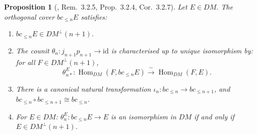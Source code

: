 \documentclass[12pt,a4paper]{article}
\newtheorem{proposition}[theorem]{Proposition}
\theoremstyle{definition}
\newcommand{\Hom}{\operatorname{Hom}}
\newcommand{\id}{\mathrm{id}}
\begin{document}
\begin{proposition}[\cite{Pel17}, Rem.\ 3.2.5, Prop.\ 3.2.4, Cor.\ 3.2.7]
\label{prop:bc-properties}
Let $E\in DM$.  The orthogonal cover $bc_{\leq n}E$ satisfies:
\begin{enumerate}
  \item $bc_{\leq n}E\in DM^\perp(n+1)$.
  \item The counit $\theta_n:j_{n+1}p_{n+1}\to\id$ is characterised up to unique
    isomorphism by: for all $F\in DM^\perp(n+1)$,
    \[
      \theta_{n*}^E:\Hom_{DM}(F,bc_{\leq n}E)\xrightarrow{\;\sim\;}\Hom_{DM}(F,E).
    \]
  \item There is a canonical natural transformation $\iota_n:bc_{\leq n}\to
    bc_{\leq n+1}$, and $bc_{\leq n}\circ bc_{\leq n+1}\cong bc_{\leq n}$.
  \item For $E\in DM$: $\theta_n^E:bc_{\leq n}E\to E$ is an isomorphism in $DM$
    if and only if $E\in DM^\perp(n+1)$.
\end{enumerate}
\end{proposition}
\end{document}
